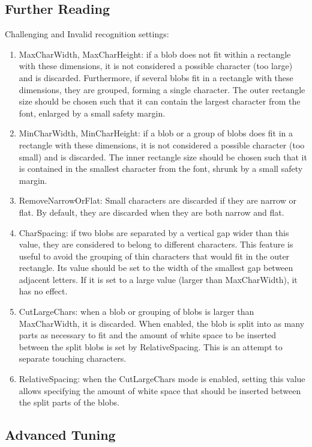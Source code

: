 \subsection{Further Reading}
Challenging and Invalid recognition settings:
\begin{enumerate}
	\item MaxCharWidth, MaxCharHeight: if a blob does not fit within a rectangle with these dimensions, it is not considered a possible character (too large) and is discarded. Furthermore, if several blobs fit in a rectangle with these dimensions, they are grouped, forming a single character. The outer rectangle size should be chosen such that it can contain the largest character from the font, enlarged by a small safety margin.
	\item MinCharWidth, MinCharHeight: if a blob or a group of blobs does fit in a rectangle with these dimensions, it is not considered a possible character (too small) and is discarded. The inner rectangle size should be chosen such that it is contained in the smallest character from the font, shrunk by a small safety margin.
	\item RemoveNarrowOrFlat: Small characters are discarded if they are narrow or flat. By default, they are discarded when they are both narrow and flat.
	\item CharSpacing: if two blobs are separated by a vertical gap wider than this value, they are considered to belong to different characters. This feature is useful to avoid the grouping of thin characters that would fit in the outer rectangle. Its value should be set to the width of the smallest gap between adjacent letters. If it is set to a large value (larger than MaxCharWidth), it has no effect.
	\item CutLargeChars: when a blob or grouping of blobs is larger than MaxCharWidth, it is discarded. When enabled, the blob is split into as many parts as necessary to fit and the amount of white space to be inserted between the split blobs is set by RelativeSpacing. This is an attempt to separate touching characters.
	\item RelativeSpacing: when the CutLargeChars mode is enabled, setting this value allows specifying the amount of white space that should be inserted between the split parts of the blobs.
\end{enumerate}
\subsection{Advanced Tuning}

